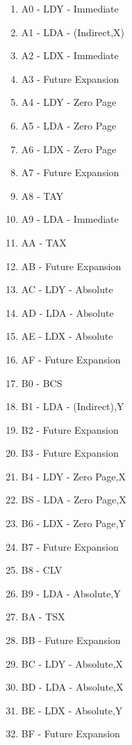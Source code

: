 \documentclass{article}
\begin{document}
\begin{multicols}{2}
\begin{enumerate}[label=\enumHex*,start=0]
    \item A0 - LDY - Immediate
    \item A1 - LDA - (Indirect,X)
    \item A2 - LDX - Immediate
    \item A3 - Future Expansion
    \item A4 - LDY - Zero Page
    \item A5 - LDA - Zero Page
    \item A6 - LDX - Zero Page
    \item A7 - Future Expansion
    \item A8 - TAY
    \item A9 - LDA - Immediate
    \item AA - TAX
    \item AB - Future Expansion
    \item AC - LDY - Absolute
    \item AD - LDA - Absolute
    \item AE - LDX - Absolute
    \item AF - Future Expansion
    \item B0 - BCS
    \item B1 - LDA - (Indirect),Y
    \item B2 - Future Expansion
    \item B3 - Future Expansion
    \item B4 - LDY - Zero Page,X
    \item BS - LDA - Zero Page,X
    \item B6 - LDX - Zero Page,Y
    \item B7 - Future Expansion
    \item B8 - CLV
    \item B9 - LDA - Absolute,Y
    \item BA - TSX
    \item BB - Future Expansion
    \item BC - LDY - Absolute,X
    \item BD - LDA - Absolute,X
    \item BE - LDX - Absolute,Y
    \item BF - Future Expansion


\end{enumerate}
\end{multicols}
\end{document}
